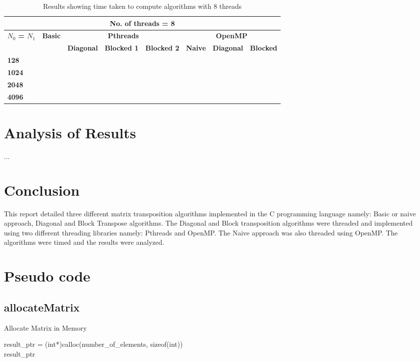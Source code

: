 \documentclass[10pt, onecolumn]{article}
\begin{document}
\begin{table}[H]
    \vspace{-0.5cm}
    \centering
    \caption{Results showing time taken to compute algorithms with 8 threads}
    \label{tbl:Results8Threads}
    \begin{tabular}{|l|l|l|l|l|l|l|l|}
    \hline
    \multicolumn{8}{|c|}{\textbf{No. of threads = 8}} \\ \hline
    \multirow{2}{*}{\textbf{$N_0$ = $N_1$}} & \multicolumn{1}{c|}{\textbf{Basic}} & \multicolumn{3}{c|}{\textbf{Pthreads}} & \multicolumn{3}{c|}{\textbf{OpenMP}} \\ \cline{2-8} 
     & \textbf{} & \textbf{Diagonal} & \textbf{Blocked 1} & \textbf{Blocked 2} & \textbf{Naive} & \textbf{Diagonal} & \textbf{Blocked} \\ \hline
    \textbf{128}  &  &  &  &  &  &  &  \\ \hline
    \textbf{1024} &  &  &  &  &  &  &  \\ \hline
    \textbf{2048} &  &  &  &  &  &  &  \\ \hline
    \textbf{4096} &  &  &  &  &  &  &  \\ \hline
    \end{tabular}
\end{table}
%
\section{Analysis of Results}
%
...
%
\section{Conclusion}
%
This report detailed three different matrix transposition algorithms implemented in the C programming language namely: Basic or naive approach, Diagonal and Block Transpose algorithms. The Diagonal and Block transposition algorithms were threaded and implemented using two different threading libraries namely: Pthreads and OpenMP. The Naive approach was also threaded using OpenMP. The algorithms were timed and the results were analyzed.
%
\clearpage
\appendix

\section{Pseudo code}
\label{App:Apendix}
\subsection{allocateMatrix}
    \begin{algorithm}[H]
        \label{Alg:allocateMatrix}
        \caption{Allocate Matrix in Memory}
        result\_ptr = (int*)calloc(number\_of\_elements, sizeof(int)) \\
        \Return result\_ptr
    \end{algorithm}
%
\end{document}
